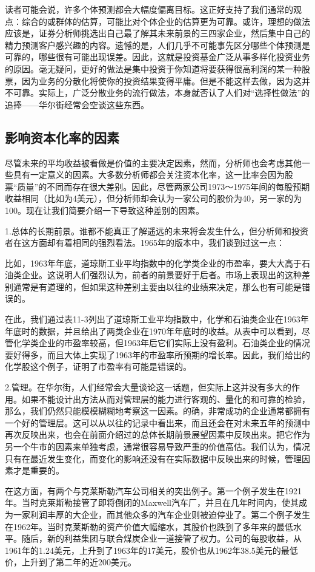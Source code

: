 \documentclass[12pt,oneside]{book}
\begin{document}
读者可能会说，许多个体预测都会大幅度偏离目标。这正好支持了我们通常的观点：综合的或群体的估算，可能比对个体企业的估算更为可靠。或许，理想的做法应该是，证券分析师挑选出自己最了解其未来前景的三四家企业，然后集中自己的精力预测客户感兴趣的内容。遗憾的是，人们几乎不可能事先区分哪些个体预测是可靠的，哪些很有可能出现误差。因此，这就是投资基金广泛从事多样化投资业务的原因。毫无疑问，更好的做法是集中投资于你知道将要获得很高利润的某一种股票，因为业务的分散化将使你的投资结果变得平庸。但是不能这样去做，因为这并不可靠。实际上，广泛分散业务的流行做法，本身就否认了人们对“选择性做法”的追捧——华尔街经常会空谈这些东西。

\subsection{影响资本化率的因素}
尽管未来的平均收益被看做是价值的主要决定因素，然而，分析师也会考虑其他一些具有一定意义的因素。大多数分析师都会关注资本化率，这一比率会因为股票“质量”的不同而存在很大差别。因此，尽管两家公司1973～1975年间的每股预期收益相同（比如为4美元），但分析师却会认为一家公司的股价为40，另一家的为100。现在让我们简要介绍一下导致这种差别的因素。

1.总体的长期前景。谁都不能真正了解遥远的未来将会发生什么，但分析师和投资者在这方面却有着相同的强烈看法。1965年的版本中，我们谈到过这一点：

比如，1963年年底，道琼斯工业平均指数中的化学类企业的市盈率，要大大高于石油类企业。这说明人们强烈认为，前者的前景要好于后者。市场上表现出的这种差别通常是有道理的，但如果这种差别主要由以往的业绩来决定，那么也有可能是错误的。

在此，我们通过表11-3列出了道琼斯工业平均指数中，化学和石油类企业在1963年年底时的数据，并且给出了两类企业在1970年年底时的收益。从表中可以看到，尽管化学类企业的市盈率较高，但1963年后它们实际上没有盈利。石油类企业的情况要好得多，而且大体上实现了1963年的市盈率所预期的增长率。因此，我们给出的化学股这个例子，证明了市盈率有可能是错误的。


2.管理。在华尔街，人们经常会大量谈论这一话题，但实际上这并没有多大的作用。如果不能设计出方法从而对管理层的能力进行客观的、量化的和可靠的检验，那么，我们仍然只能模模糊糊地考察这一因素。的确，非常成功的企业通常都拥有一个好的管理层。这可以从以往的记录中看出来，而且还会在对未来五年的预测中再次反映出来，也会在前面介绍过的总体长期前景展望因素中反映出来。把它作为另一个牛市的因素来单独考虑，通常很容易导致严重的价值高估。我们认为，情况只有在最近发生变化，而变化的影响还没有在实际数据中反映出来的时候，管理因素才是重要的。

在这方面，有两个与克莱斯勒汽车公司相关的突出例子。第一个例子发生在1921年。当时克莱斯勒接管了即将倒闭的Maxwell汽车厂，并且在几年时间内，使其成为一家利润丰厚的大企业，而其他众多的汽车企业则被迫停业了。第二个例子发生在1962年。当时克莱斯勒的资产价值大幅缩水，其股价也跌到了多年来的最低水平。随后，新的利益集团与联合煤炭企业一道接管了权力。公司的每股收益，从1961年的1.24美元，上升到了1963年的17美元，股价也从1962年38.5美元的最低价，上升到了第二年的近200美元。
\end{document}
